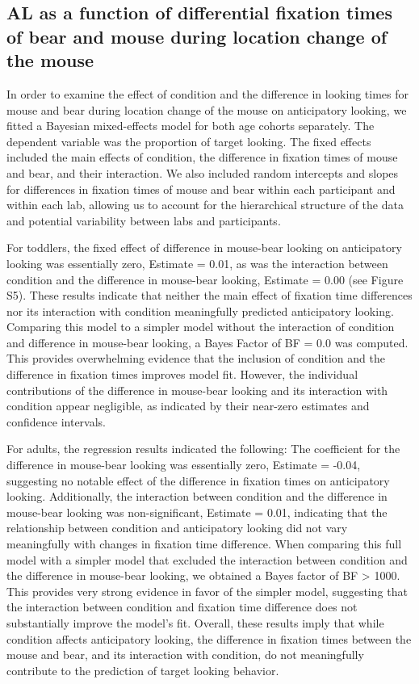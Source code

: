 \documentclass[
  man, donotrepeattitle,floatsintext]{apa6}
\begin{document}
\subsection{AL as a function of differential fixation times of bear and mouse during location change of the mouse}\label{al-as-a-function-of-differential-fixation-times-of-bear-and-mouse-during-location-change-of-the-mouse}

In order to examine the effect of condition and the difference in looking times for mouse and bear during location change of the mouse on anticipatory looking, we fitted a Bayesian mixed-effects model for both age cohorts separately. The dependent variable was the proportion of target looking. The fixed effects included the main effects of condition, the difference in fixation times of mouse and bear, and their interaction. We also included random intercepts and slopes for differences in fixation times of mouse and bear within each participant and within each lab, allowing us to account for the hierarchical structure of the data and potential variability between labs and participants.

For toddlers, the fixed effect of difference in mouse-bear looking on anticipatory looking was essentially zero, Estimate = 0.01, as was the interaction between condition and the difference in mouse-bear looking, Estimate = 0.00 (see Figure S5). These results indicate that neither the main effect of fixation time differences nor its interaction with condition meaningfully predicted anticipatory looking. Comparing this model to a simpler model without the interaction of condition and difference in mouse-bear looking, a Bayes Factor of BF = 0.0 was computed. This provides overwhelming evidence that the inclusion of condition and the difference in fixation times improves model fit. However, the individual contributions of the difference in mouse-bear looking and its interaction with condition appear negligible, as indicated by their near-zero estimates and confidence intervals.

For adults, the regression results indicated the following:
The coefficient for the difference in mouse-bear looking was essentially zero, Estimate = -0.04, suggesting no notable effect of the difference in fixation times on anticipatory looking. Additionally, the interaction between condition and the difference in mouse-bear looking was non-significant, Estimate = 0.01, indicating that the relationship between condition and anticipatory looking did not vary meaningfully with changes in fixation time difference. When comparing this full model with a simpler model that excluded the interaction between condition and the difference in mouse-bear looking, we obtained a Bayes factor of BF \textgreater{} 1000. This provides very strong evidence in favor of the simpler model, suggesting that the interaction between condition and fixation time difference does not substantially improve the model's fit. Overall, these results imply that while condition affects anticipatory looking, the difference in fixation times between the mouse and bear, and its interaction with condition, do not meaningfully contribute to the prediction of target looking behavior.
\end{document}
